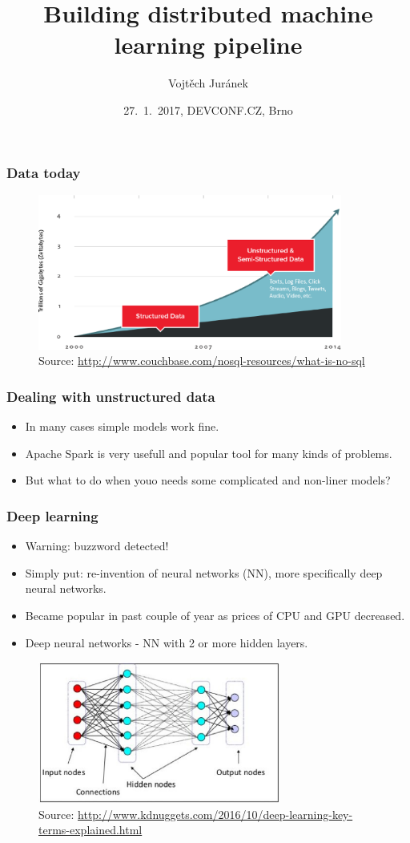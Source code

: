 \documentclass[10pt,utf8]{beamer}
\title{Building distributed machine learning pipeline}
\author{Vojtěch Juránek}
\institute[Red Hat]{JBoss - a division by Red Hat}
\date{27.~1.~2017, DEVCONF.CZ, Brno}
\begin{document}
	
\begin{frame}
 \titlepage
\end{frame}
	
\begin{frame}
	\frametitle{Data today}
	\begin{figure}
		\centering
		\includegraphics[width=10cm]{./img/why-nosql-2.eps}
		\caption{\tiny{Source: \url{http://www.couchbase.com/nosql-resources/what-is-no-sql}}}
	\end{figure}
\end{frame}

\begin{frame}
	\frametitle{Dealing with unstructured data}
	\begin{itemize}
	 \item In many cases simple models work fine.
	 \pause
	 \item Apache Spark is very usefull and popular tool for many kinds of problems.
	 \pause
	 \item But what to do when youo needs some complicated and non-liner models?
	\end{itemize}
\end{frame}

\begin{frame}
	\frametitle{Deep learning}
	\begin{itemize}
		\item \color{red}Warning: buzzword detected!\color{black}
		\pause
		\item Simply put: re-invention of neural networks (NN), more specifically deep neural networks.
		\pause
		\item Became popular in past couple of year as prices of CPU and GPU decreased.
		\pause
		\item Deep neural networks - NN with 2 or more hidden layers.
	\end{itemize}
	 {
	\begin{figure}
		\centering
		\includegraphics[width=8cm]{./img/neural-networks-layers.eps}
		\caption{\tiny{Source: \url{http://www.kdnuggets.com/2016/10/deep-learning-key-terms-explained.html}}}
	\end{figure}
	}
\end{frame}
\end{document}
